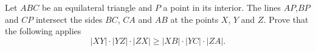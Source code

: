 Let $ABC$ be an equilateral triangle and $P$ a point in its interior. 
The lines $AP$,$BP$ and $CP$ intersect the sides $BC$, $CA$ and $AB$ at the points $X$, $Y$ and $Z$.
Prove that the following applies
$$|XY|\cdot |YZ| \cdot |ZX| \geq |XB|\cdot |YC| \cdot |ZA|.$$